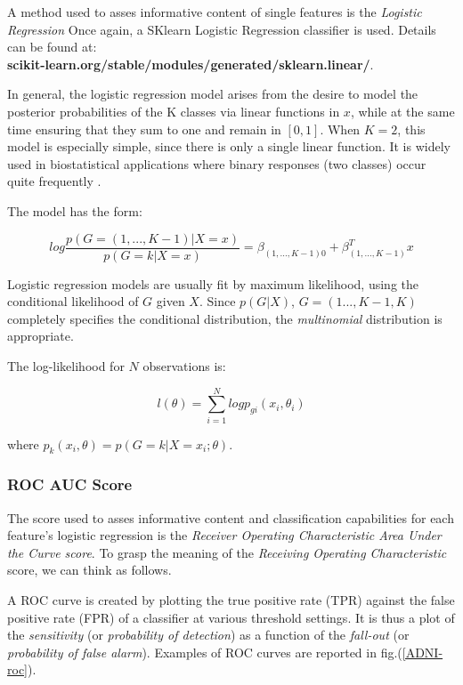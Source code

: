 \documentclass[12pt,openright,twoside,a4paper]{book}
\begin{document}
A method used to asses informative content of single features is the \textit{Logistic Regression}
Once again, a SKlearn Logistic Regression classifier is used. 
Details can be found at: \\ \textbf{scikit-learn.org/stable/modules/generated/sklearn.linear/}.

In general, the logistic regression model arises from the desire to model the posterior probabilities of the K classes via linear functions in $x$, while at the same time ensuring that they sum to one and remain in $[0,1]$.
When $K = 2$, this model is especially simple, since there is only a single linear function. It is widely used in biostatistical applications where binary responses (two classes) occur quite frequently \cite{ESL}.

The model has the form:

\begin{equation}
log\frac{p(G=(1,...,K-1)|X=x)}{p(G=k|X=x)}=\beta_{(1,...,K-1)0}+\beta^T_{(1,...,K-1)}x
\end{equation}

Logistic regression models are usually fit by maximum likelihood, using the conditional likelihood of $G$ given $X$. Since $p(G|X)$, $G=(1...,K-1,K)$ completely specifies the conditional distribution, the \textit{multinomial} distribution is appropriate. 

The log-likelihood for $N$ observations is:

\begin{equation}
l(\theta)=\sum_{i=1}^N log p_{gi}(x_i,\theta_i)
\end{equation}

where $p_k(x_i,\theta)=p(G = k|X = x_i; \theta)$.

\subsubsection{ROC AUC Score}

The score used to asses informative content and classification capabilities for each feature's logistic regression is the \textit{Receiver Operating Characteristic Area Under the Curve score}.
To grasp the meaning of the \textit{Receiving Operating Characteristic} score, we can think as follows. 

A ROC  curve is created by plotting the true positive rate (TPR) against the false positive rate (FPR) of a classifier at various threshold settings.
It is thus a plot of the \textit{sensitivity} (or \textit{probability of detection}) as a function of the \textit{fall-out} (or \textit{probability of false alarm}). 
Examples of ROC curves are reported in fig.(\ref{ADNI-roc}).
\end{document}
